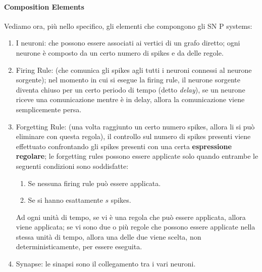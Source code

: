 \documentclass[12pt,a4paper]{report}
\begin{document}
\paragraph{Composition Elements}
Vediamo ora, più nello specifico, gli elementi che compongono gli SN P systems:
\begin{enumerate}
\item I neuroni: che possono essere associati ai vertici di un grafo diretto; ogni neurone è composto da un certo numero di spikes e da delle regole.
\item Firing Rule: (che comunica gli spikes agli tutti i neuroni connessi al neurone sorgente); nel momento in cui si esegue la firing rule, il neurone sorgente diventa chiuso per un certo periodo di tempo (detto \textit{delay}), se un neurone riceve una comunicazione mentre è in delay, allora la comunicazione viene semplicemente persa.
\item Forgetting Rule: (una volta raggiunto un certo numero spikes, allora li si può eliminare con questa regola), il controllo sul numero di spikes presenti viene effettuato confrontando gli spikes presenti con una certa \textbf{espressione regolare}; le forgetting rules possono essere applicate solo quando entrambe le seguenti condizioni sono soddisfatte:
\begin{enumerate}
\item Se nessuna firing rule può essere applicata.
\item Se si hanno esattamente $s$ spikes.
\end{enumerate}
Ad ogni unità di tempo, se vi è una regola che può essere applicata, allora viene applicata; se vi sono due o più regole che possono essere applicate nella stessa unità di tempo, allora una delle due viene scelta, non deterministicamente, per essere eseguita.
\item Synapse: le sinapsi sono il collegamento tra i vari neuroni.
\end{enumerate}
\end{document}
